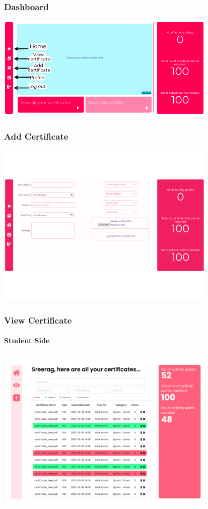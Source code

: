 \begin{frame}
  \frametitle{Dashboard }
   
\centering
{\includegraphics[width=10.5cm]{dashboard_edit.png}}
\end{frame}

\begin{frame}
  \frametitle{Add Certificate }
   
\centering
{\includegraphics[width=10.5cm]{add_certificate.png}}
\end{frame}

\begin{frame}
  \frametitle{View Certificate }
   \framesubtitle{Student Side}
\centering
{\includegraphics[width=10.5cm]{certificates.png}}
\end{frame}

